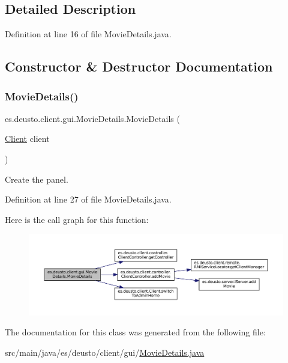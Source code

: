 \subsection{Detailed Description}


Definition at line 16 of file Movie\+Details.\+java.



\subsection{Constructor \& Destructor Documentation}
\mbox{\label{classes_1_1deusto_1_1client_1_1gui_1_1_movie_details_a70cbaf928eec4995db7a779d0f175ee9}} 
\subsubsection{\texorpdfstring{MovieDetails()}{MovieDetails()}}
{\footnotesize\ttfamily es.\+deusto.\+client.\+gui.\+Movie\+Details.\+Movie\+Details (\begin{DoxyParamCaption}\item[{\mbox{\hyperlink{classes_1_1deusto_1_1client_1_1_client}{Client}}}]{client }\end{DoxyParamCaption})}

Create the panel. 

Definition at line 27 of file Movie\+Details.\+java.

Here is the call graph for this function\+:
\nopagebreak
\begin{figure}[H]
\begin{center}
\leavevmode
\includegraphics[width=350pt]{classes_1_1deusto_1_1client_1_1gui_1_1_movie_details_a70cbaf928eec4995db7a779d0f175ee9_cgraph}
\end{center}
\end{figure}


The documentation for this class was generated from the following file\+:\begin{DoxyCompactItemize}
\item 
src/main/java/es/deusto/client/gui/\mbox{\hyperlink{_movie_details_8java}{Movie\+Details.\+java}}\end{DoxyCompactItemize}
